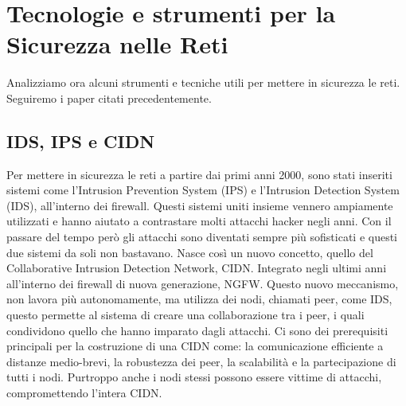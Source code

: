     \section{Tecnologie e strumenti per la Sicurezza nelle Reti}
        Analizziamo ora alcuni strumenti e tecniche utili per mettere in sicurezza le reti. Seguiremo i paper citati precedentemente.
        \subsection{IDS, IPS e CIDN}
            Per mettere in sicurezza le reti a partire dai primi anni 2000, sono stati inseriti sistemi come l'Intrusion Prevention System (IPS) e l'Intrusion Detection System (IDS), all'interno dei firewall. Questi sistemi uniti insieme vennero ampiamente utilizzati e hanno aiutato a contrastare molti attacchi hacker negli anni. Con il passare del tempo però gli attacchi sono diventati sempre più sofisticati e questi due sistemi da soli non bastavano. Nasce così un nuovo concetto, quello del Collaborative Intrusion Detection Network, CIDN. Integrato negli ultimi 
            anni all'interno dei firewall di nuova generazione, NGFW.
            Questo nuovo meccanismo, non lavora più autonomamente, ma utilizza dei nodi, chiamati peer, come IDS, questo permette al sistema di creare una collaborazione tra i peer, i quali condividono quello che hanno imparato dagli attacchi. Ci sono dei prerequisiti principali per la costruzione di una CIDN come: la comunicazione efficiente a distanze medio-brevi, la robustezza dei peer, la scalabilità e la partecipazione di tutti i nodi. Purtroppo anche i nodi stessi possono essere vittime di attacchi, compromettendo l'intera CIDN.
            
